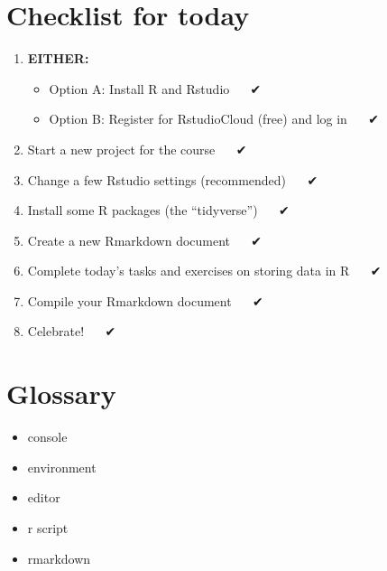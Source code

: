 \documentclass[]{book}
\providecommand{\tightlist}{%
  \setlength{\itemsep}{0pt}\setlength{\parskip}{0pt}}
\begin{document}
\hypertarget{checklist-for-today}{%
\section{Checklist for today}\label{checklist-for-today}}

\begin{enumerate}
\def\labelenumi{\arabic{enumi}.}
\tightlist
\item
  \textbf{EITHER:}

  \begin{itemize}
  \tightlist
  \item
    Option A: Install R and Rstudio   ✔
  \item
    Option B: Register for RstudioCloud (free) and log in   ✔
  \end{itemize}
\item
  Start a new project for the course   ✔
\item
  Change a few Rstudio settings (recommended)   ✔
\item
  Install some R packages (the ``tidyverse'')   ✔
\item
  Create a new Rmarkdown document   ✔
\item
  Complete today's tasks and exercises on storing data in R   ✔
\item
  Compile your Rmarkdown document   ✔
\item
  Celebrate!   ✔ 🎉
\end{enumerate}

\hypertarget{glossary}{%
\section*{Glossary}\label{glossary}}

\begin{itemize}
\tightlist
\item
  console
\item
  environment
\item
  editor
\item
  r script
\item
  rmarkdown
\end{itemize}
\end{document}
